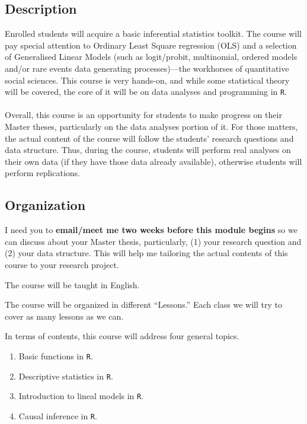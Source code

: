 \documentclass[letterpaper]{article}
\renewenvironment{itemize}{
  \begin{list}{}{
    \setlength{\leftmargin}{1.5em}
  }
}{
  \end{list}
}
\begin{document}
\subsection*{Description}

Enrolled students will acquire a basic inferential statistics toolkit. The course will pay special attention to Ordinary Least Square regression (OLS) and a selection of Generalised Linear Models (such as logit/probit, multinomial, ordered models and/or rare events data generating processes)---the workhorses of quantitative social sciences. This course is very hands-on, and while some statistical theory will be covered, the core of it will be on data analyses and programming in \texttt{R}. 
\\
\\
Overall, this course is an opportunity for students to make progress on their Master theses, particularly on the data analyses portion of it. For those matters, the actual content of the course will follow the students' research questions and data structure. Thus, during the course, students will perform real analyses on their own data (if they have those data already available), otherwise students will perform replications. 


\subsection*{Organization}

\begin{itemize}
  \item[{\color{red}\Pointinghand}] I need you to {\bf email/meet me two weeks before this module begins} so we can discuss about your Master thesis, particularly, (1) your research question and (2) your data structure. This will help me tailoring the actual contents of this course to your research project.
  \item[$\circ$] The course will be taught in English.
  \item[$\circ$] The course will be organized in different ``Lessons.'' Each class we will try to cover as many lessons as we can.
\end{itemize}

In terms of contents, this course will address four general topics.

\begin{enumerate}
	\item Basic functions in \texttt{R}.
	\item Descriptive statistics in \texttt{R}.
	\item Introduction to lineal models in \texttt{R}.
 	\item Causal inference in \texttt{R}.
\end{enumerate}
\end{document}
